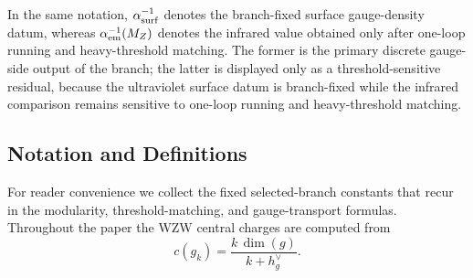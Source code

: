 \documentclass[11pt]{article}
\begin{document}
In the same notation, $\alpha^{-1}_{\rm surf}$ denotes the branch-fixed surface gauge-density datum, whereas $\alpha^{-1}_{\rm em}(M_Z)$ denotes the infrared value obtained only after one-loop running and heavy-threshold matching. The former is the primary discrete gauge-side output of the branch; the latter is displayed only as a threshold-sensitive residual, because the ultraviolet surface datum is branch-fixed while the infrared comparison remains sensitive to one-loop running and heavy-threshold matching.

\subsection*{Notation and Definitions}

For reader convenience we collect the fixed selected-branch constants that recur in
the modularity, threshold-matching, and gauge-transport formulas. Throughout
the paper the WZW central charges are computed from
\begin{equation}
 c(g_k)=\frac{k\,\dim(g)}{k+h_g^{\vee}}.
\end{equation}
\end{document}
